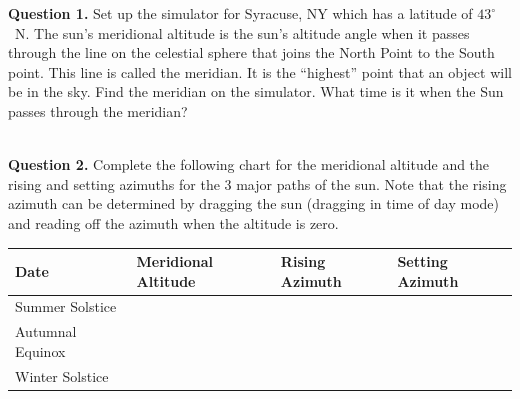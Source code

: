 \documentclass[11pt]{article}
\begin{document}
\vspace*{0.5cm}
\noindent
\textbf{Question 1.} Set up the simulator for Syracuse, NY which has a latitude of $43^\circ$~N. The sun's meridional altitude is the sun's altitude angle when it passes through the line on the celestial sphere that joins the North Point to the South point. This line is called the meridian. It is the ``highest'' point that an object will be in the sky. Find the meridian on the simulator. What time is it when the Sun passes through the meridian?
\vspace*{0.8cm}

\hrulefill\\

\vspace*{-0.2cm}
\noindent
\textbf{Question 2.}
Complete the following chart for the meridional altitude and the rising and setting azimuths for the 3 major paths of the sun. Note that the rising azimuth can be determined by dragging the sun (dragging in time of day mode) and reading off the azimuth when the altitude is zero. 

\begin{center}
\begin{tabular}{|l||l|l|l|}
\hline
\textbf{Date} & \textbf{Meridional Altitude} & \textbf{Rising Azimuth} & \textbf{Setting Azimuth} \\\hline\hline
Summer Solstice  & \parbox{0.12\linewidth}{\vspace*{1cm}} & \parbox{0.12\linewidth}{\vspace*{1cm}} & \parbox{0.12\linewidth}{\vspace*{1cm}} \\\hline
Autumnal Equinox & \parbox{0.12\linewidth}{\vspace*{1cm}} & \parbox{0.12\linewidth}{\vspace*{1cm}} & \parbox{0.12\linewidth}{\vspace*{1cm}} \\\hline
Winter Solstice  & \parbox{0.12\linewidth}{\vspace*{1cm}} & \parbox{0.12\linewidth}{\vspace*{1cm}} & \parbox{0.12\linewidth}{\vspace*{1cm}} \\\hline
\end{tabular}
\end{center}
\newpage
\end{document}
